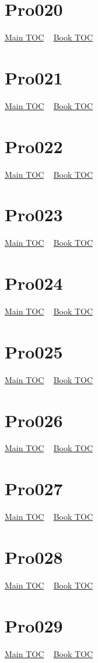 \documentclass{book}
\begin{document}
  \section{Pro020}\hyperlink{toc}{Main TOC} ~ \hyperref[subsec:Pro]{Book TOC} 
  \section{Pro021}\hyperlink{toc}{Main TOC} ~ \hyperref[subsec:Pro]{Book TOC} 
  \section{Pro022}\hyperlink{toc}{Main TOC} ~ \hyperref[subsec:Pro]{Book TOC} 
  \section{Pro023}\hyperlink{toc}{Main TOC} ~ \hyperref[subsec:Pro]{Book TOC} 
  \section{Pro024}\hyperlink{toc}{Main TOC} ~ \hyperref[subsec:Pro]{Book TOC} 
  \section{Pro025}\hyperlink{toc}{Main TOC} ~ \hyperref[subsec:Pro]{Book TOC} 
  \section{Pro026}\hyperlink{toc}{Main TOC} ~ \hyperref[subsec:Pro]{Book TOC} 
  \section{Pro027}\hyperlink{toc}{Main TOC} ~ \hyperref[subsec:Pro]{Book TOC} 
  \section{Pro028}\hyperlink{toc}{Main TOC} ~ \hyperref[subsec:Pro]{Book TOC} 
  \section{Pro029}\hyperlink{toc}{Main TOC} ~ \hyperref[subsec:Pro]{Book TOC} 
\end{document}
